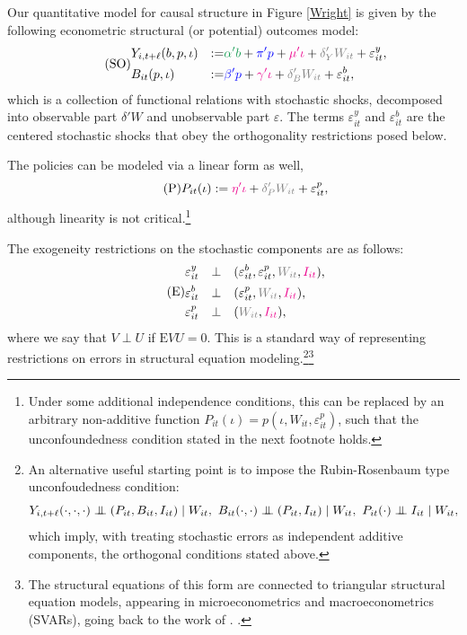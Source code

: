 \documentclass[11pt,reqno,letter]{amsart}
\theoremstyle{definition}
\newcommand\indep{\protect\mathpalette{\protect\independenT}{\perp}}
\def\independenT#1#2{\mathrel{\setbox0\hbox{$#1#2$}%
    \copy0\kern-\wd0\mkern4mu\box0}}
\newcommand{\Ep}{{\mathrm{E}}}
\def\bcolor{\color{ForestGreen}}
\def\pcolor{\color{blue}}
\def\icolor{\color{magenta}}
\def\wcolor{\color{gray}}
\begin{document}
Our quantitative model for causal structure in Figure \ref{Wright} is given by the following econometric structural (or potential) outcomes model:\begin{equation} \label{eqn:SEM1} \tag{SO}
  \begin{aligned}
   &  Y_{i,t+\ell} (b,p,\iota) &:=& {\bcolor \alpha ' b}  +  {\pcolor \pi 'p} +
    {\icolor \mu'\iota } + {\wcolor \delta_Y 'W_{it}} + \varepsilon^y_{it}, \\
   &  B_{it} (p,\iota) &:= & {\pcolor \beta'p } + {\icolor \gamma'\iota} +      {\wcolor\delta_B 'W_{it} } + \varepsilon^b_{it},
      \end{aligned}
 \end{equation}
which is a collection of functional relations with stochastic shocks, decomposed into observable part $\delta' W$ and unobservable part $\varepsilon$.
The terms $\varepsilon^y_{it}$ and  $\varepsilon^b_{it} $  are the centered stochastic shocks that obey the orthogonality restrictions posed below.


The policies can be modeled via a linear form as well,
\begin{equation}\label{eq:Policy} \tag{P}
 P_{it}   (\iota) :=  {\icolor\eta'\iota} + {\wcolor \delta_P' W_{it}} +   \varepsilon^p_{it},   \end{equation}
although  linearity is not critical.\footnote{Under some additional independence conditions, this
can be replaced by an arbitrary non-additive function $P_{it}(\iota) = p (\iota, W_{it},  \varepsilon^p_{it})$, such that the unconfoundedness condition stated in the next footnote holds.}


The exogeneity restrictions on the stochastic components are as follows:
\begin{equation}\label{eqn:SEM2} \tag{E}
\begin{aligned}
   & \varepsilon^y_{it} &  \perp &  \quad (\varepsilon^b_{it}, \varepsilon^p_{it}, {\wcolor W_{it}}, {\icolor I_{it}}), \\
&  \varepsilon^b_{it}  & \perp & \quad  (\varepsilon^p_{it}, {\wcolor W_{it}}, {\icolor I_{it}}), \\
&   \varepsilon^p_{it} &  \perp &  \quad ({\wcolor W_{it}}, {\icolor I_{it}}),
\end{aligned}
\end{equation}
where we say that $V \perp U$ if $\Ep VU = 0$. This is a standard way of representing restrictions on errors in structural equation modeling.\footnote{ An alternative useful
starting point is to impose the Rubin-Rosenbaum type unconfoudedness condition:
$$
Y_{i,t+\ell} (\cdot,\cdot,\cdot)  \indep (P_{it}, B_{it}, I_{it})  \mid W_{it}, \
B_{it} (\cdot,\cdot)  \indep (P_{it}, I_{it})  \mid W_{it}, \
 P_{it} (\cdot)  \indep  I_{it}  \mid W_{it},
$$
which imply, with treating stochastic errors as independent additive components, the orthogonal conditions stated above.
 }\footnote{The structural equations of this form are connected to triangular structural equation models, appearing
 in microeconometrics and macroeconometrics (SVARs), going back to the work of  \cite{strotz1960recursive}. .}
\end{document}
